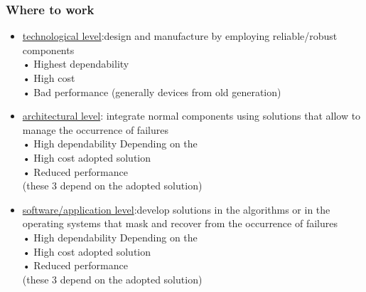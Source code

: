 \documentclass[10pt, oneside]{article}
\begin{document}
\subsubsection{Where to work}
\begin{itemize}
    \item \underline{technological level}:design and manufacture by employing reliable/robust components\\• Highest dependability\\
    • High cost\\
    • Bad performance (generally devices from old generation)
    \item \underline{architectural level}: integrate normal components using solutions that allow to manage the occurrence of failures\\
    • High dependability
    Depending on the\\ • High cost adopted solution\\
    • Reduced performance\\(these 3 depend on the adopted solution)
    \item \underline{software/application level}:develop solutions in the algorithms or in the operating systems that mask and recover from the occurrence of failures\\
    • High dependability
    Depending on the\\ • High cost adopted solution\\
    • Reduced performance\\(these 3 depend on the adopted solution)
\end{itemize}

\end{document}

